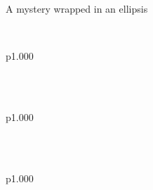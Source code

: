 \label{Ocamlary--type-any_obj}\\
\label{Ocamlary--type-empty_obj}\\
\label{Ocamlary--type-one_meth}\\
\label{Ocamlary--type-ext}\begin{ocamlindent}A mystery wrapped in an ellipsis\end{ocamlindent}%
\medbreak
\label{Ocamlary--extension-decl-ExtA}\\
\begin{ocamltabular}{p{1.000\textwidth}}\label{Ocamlary--extension-ExtA}\\
\end{ocamltabular}%
\\
\label{Ocamlary--extension-decl-ExtB}\\
\begin{ocamltabular}{p{1.000\textwidth}}\label{Ocamlary--extension-ExtB}\\
\end{ocamltabular}%
\\
\label{Ocamlary--extension-decl-ExtC}\\
\begin{ocamltabular}{p{1.000\textwidth}}\label{Ocamlary--extension-ExtC}\\
\label{Ocamlary--extension-ExtD}\\
\end{ocamltabular}%
\\
\label{Ocamlary--extension-decl-ExtE}\\
